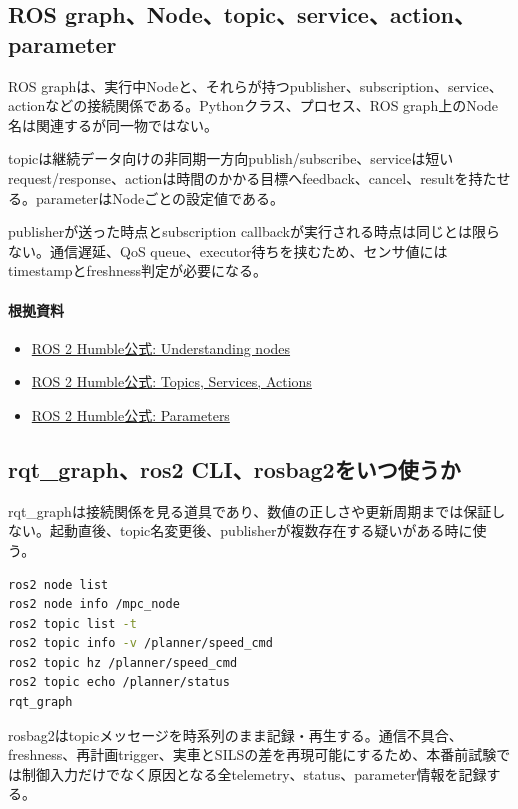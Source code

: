 \documentclass[a4paper,11pt]{article}
\begin{document}
\subsection{ROS graph、Node、topic、service、action、parameter}
ROS graphは、実行中Nodeと、それらが持つpublisher、subscription、service、actionなどの接続関係である。Pythonクラス、プロセス、ROS graph上のNode名は関連するが同一物ではない。


topicは継続データ向けの非同期一方向publish/subscribe、serviceは短いrequest/response、actionは時間のかかる目標へfeedback、cancel、resultを持たせる。parameterはNodeごとの設定値である。


publisherが送った時点とsubscription callbackが実行される時点は同じとは限らない。通信遅延、QoS queue、executor待ちを挟むため、センサ値にはtimestampとfreshness判定が必要になる。

\paragraph{根拠資料}
\begin{itemize}[leftmargin=1.6em]
\item \href{https://docs.ros.org/en/humble/Tutorials/Beginner-CLI-Tools/Understanding-ROS2-Nodes/Understanding-ROS2-Nodes.html}{ROS 2 Humble公式: Understanding nodes}
\item \href{https://docs.ros.org/en/humble/Concepts/Basic/Interfaces-Topics-Services-Actions.html}{ROS 2 Humble公式: Topics, Services, Actions}
\item \href{https://docs.ros.org/en/humble/Concepts/Basic/About-Parameters.html}{ROS 2 Humble公式: Parameters}
\end{itemize}

\subsection{rqt\_graph、ros2 CLI、rosbag2をいつ使うか}
rqt\_graphは接続関係を見る道具であり、数値の正しさや更新周期までは保証しない。起動直後、topic名変更後、publisherが複数存在する疑いがある時に使う。


\begin{lstlisting}[language=bash]
ros2 node list
ros2 node info /mpc_node
ros2 topic list -t
ros2 topic info -v /planner/speed_cmd
ros2 topic hz /planner/speed_cmd
ros2 topic echo /planner/status
rqt_graph
\end{lstlisting}


rosbag2はtopicメッセージを時系列のまま記録・再生する。通信不具合、freshness、再計画trigger、実車とSILSの差を再現可能にするため、本番前試験では制御入力だけでなく原因となる全telemetry、status、parameter情報を記録する。
\end{document}
